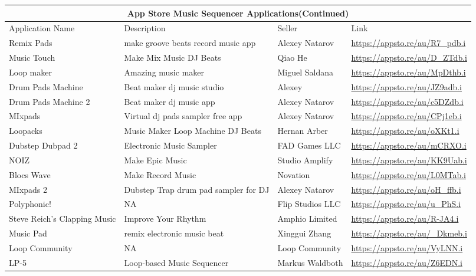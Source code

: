 \begin{tabular}{ |p{3cm}||p{3.5cm}|p{3.5cm}|p{3.5cm}||}
 \hline
 \multicolumn{4}{|c|}{App Store Music Sequencer Applications(Continued)} \\
 \hline
 Application Name   & Description  & Seller & Link\\
 \hline

 Remix Pads & make groove beats record music app & Alexey Natarov&
 \url{https://appsto.re/au/R7_pdb.i}\\

 Music Touch & Make Mix Music DJ Beats & Qiao He&
 \url{https://appsto.re/au/D_ZTdb.i}\\

 Loop maker & Amazing music maker & Miguel Saldana &
 \url{https://appsto.re/au/MpDthb.i}\\

 Drum Pads Machine & Beat maker dj music studio & Alexey&
 \url{https://appsto.re/au/JZ9adb.i}\\

 Drum Pads Machine 2 & Beat maker dj music app & Alexey Natarov&
 \url{https://appsto.re/au/c5DZdb.i}\\

 MIxpads & Virtual dj pads sampler free app & Alexey Natarov &
 \url{https://appsto.re/au/CPj1eb.i}\\

 Loopacks & Music Maker Loop Machine DJ Beats & Hernan Arber &
 \url{https://appsto.re/au/oXKt1.i}\\

 Dubstep Dubpad 2 & Electronic Music Sampler & FAD Games LLC &
 \url{https://appsto.re/au/mCRXO.i}\\

 NOIZ & Make Epic Music & Studio Amplify &
 \url{https://appsto.re/au/KK9Uab.i}\\

 Blocs Wave & Make Record Music & Novation &
 \url{https://appsto.re/au/L0MTab.i}\\

 MIxpads 2 & Dubstep Trap drum pad sampler for DJ & Alexey Natarov &
 \url{https://appsto.re/au/oH_ffb.i}\\

 Polyphonic! & NA & Flip Studios LLC &
 \url{https://appsto.re/au/u_PhS.i}\\

 Steve Reich's Clapping Music & Improve Your Rhythm & Amphio Limited &
 \url{https://appsto.re/au/R-JA4.i}\\

 Music Pad  & remix electronic music beat & Xinggui Zhang &
 \url{https://appsto.re/au/_Dkmeb.i}\\

 Loop Community & NA & Loop Community &
 \url{https://appsto.re/au/VyLNN.i}\\

 LP-5 & Loop-based Music Sequencer & Markus Waldboth &
  \url{https://appsto.re/au/Z6EDN.i}\\

  \hline
 \end{tabular}

